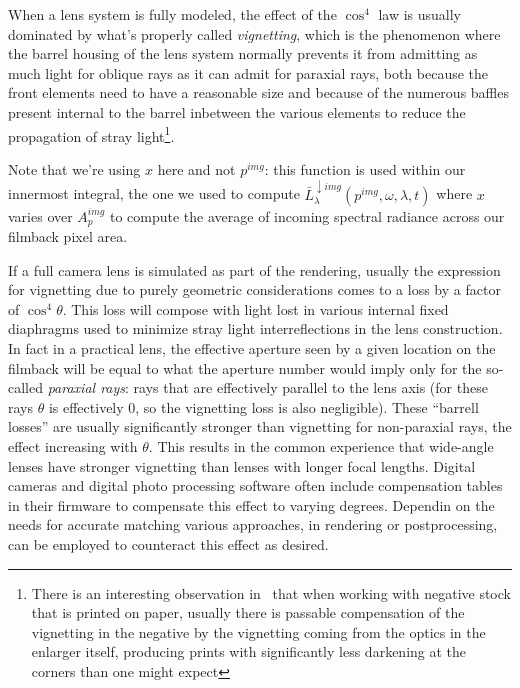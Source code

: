 When a lens system is fully modeled, the effect of the  $\cos^4$ law is usually dominated 
by what's properly called \textsl{\gls{vignetting}}, 
which is the phenomenon where the barrel housing of the lens system 
normally prevents it from admitting as much light for oblique rays as it can admit for 
paraxial rays, both because the front elements need to have a reasonable size and because of the 
numerous baffles present internal to the barrel inbetween the various elements
to reduce the propagation of stray light\footnote{
	There is an interesting observation in~\cite{kingslake92} that when working with negative
	stock that is printed on paper, usually there is passable compensation of the vignetting
	in the negative by the vignetting coming from the optics in the enlarger itself, 
	producing prints with significantly less darkening at the corners than one
	might expect}.




Note that we're using $x$ here and not $p^{img}$: this function is used within
our innermost integral, the one we used to compute  
$\bar L^{\downarrow img}_{\lambda}(p^{img}, \omega, \lambda, t)$
where $x$ varies over $A_p^{img}$ to compute the average of incoming
spectral \gls{radiance} across our filmback pixel area.


If a full camera lens is simulated as part of the rendering, usually the expression
for vignetting due to purely geometric considerations comes to a loss by a 
factor of $\cos^4\theta$. 
This loss will compose with light lost in various internal fixed 
diaphragms used to minimize stray light interreflections in the lens construction.
In fact in a practical lens, the effective aperture seen by a given 
location on the \gls{filmback} will be equal to what the aperture number would 
imply only for the so-called \textsl{paraxial rays}: rays that are effectively parallel to 
the lens axis (for these rays $\theta$ is effectively $0$, so the vignetting loss is also
negligible).
These ``barrell losses'' are usually significantly stronger than vignetting for non-paraxial
rays, the effect increasing with $\theta$.
This results in the common experience that wide-angle lenses have stronger vignetting
than lenses with longer focal lengths.
Digital cameras and digital photo processing software often include compensation 
tables in their firmware to compensate this effect to varying degrees.  
Dependin on the needs for accurate matching various approaches, in rendering or
postprocessing, can be employed to counteract this effect as desired.


